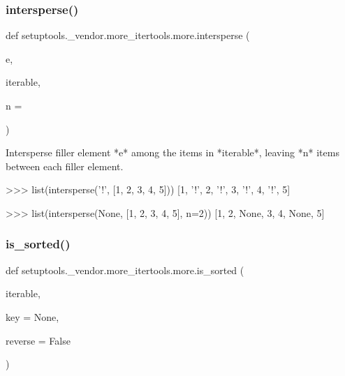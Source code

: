 \subsubsection{\texorpdfstring{intersperse()}{intersperse()}}
{\footnotesize\ttfamily def setuptools.\+\_\+vendor.\+more\+\_\+itertools.\+more.\+intersperse (\begin{DoxyParamCaption}\item[{}]{e,  }\item[{}]{iterable,  }\item[{}]{n = {} }\end{DoxyParamCaption})}

\begin{DoxyVerb}Intersperse filler element *e* among the items in *iterable*, leaving
*n* items between each filler element.

    >>> list(intersperse('!', [1, 2, 3, 4, 5]))
    [1, '!', 2, '!', 3, '!', 4, '!', 5]

    >>> list(intersperse(None, [1, 2, 3, 4, 5], n=2))
    [1, 2, None, 3, 4, None, 5]\end{DoxyVerb}
 \mbox{\label{namespacesetuptools_1_1__vendor_1_1more__itertools_1_1more_a8484d2cdc91ee314431550f3abc9a3bc}} 
\subsubsection{\texorpdfstring{is\+\_\+sorted()}{is\_sorted()}}
{\footnotesize\ttfamily def setuptools.\+\_\+vendor.\+more\+\_\+itertools.\+more.\+is\+\_\+sorted (\begin{DoxyParamCaption}\item[{}]{iterable,  }\item[{}]{key = {\ttfamily None},  }\item[{}]{reverse = {\ttfamily False} }\end{DoxyParamCaption})}

